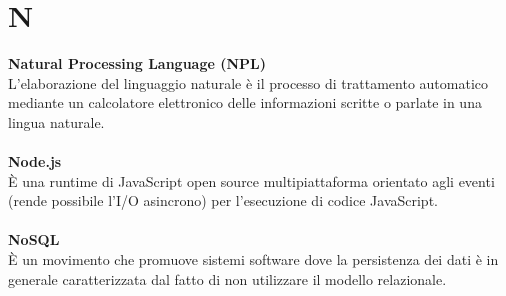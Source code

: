 \section{N}
\textbf{Natural Processing Language (NPL)}\\
L'elaborazione del linguaggio naturale è il processo di trattamento automatico mediante un calcolatore elettronico delle informazioni scritte o parlate in una lingua naturale. \\ \\
\textbf{Node.js}\\
È una runtime di JavaScript open source multipiattaforma orientato agli eventi (rende possibile l’I/O asincrono) per l'esecuzione di codice JavaScript. \\ \\
\textbf{NoSQL}\\
È un movimento che promuove sistemi software dove la persistenza dei dati è in generale caratterizzata dal fatto di non utilizzare il modello relazionale. \\ \\
\clearpage